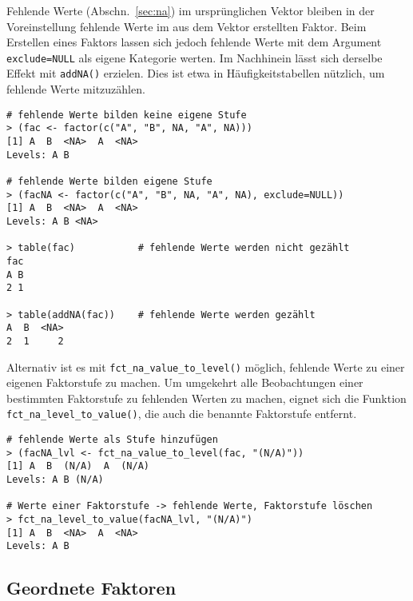 Fehlende Werte (Abschn.\ \ref{sec:na}) im ursprünglichen Vektor bleiben in der Voreinstellung fehlende Werte im aus dem Vektor erstellten Faktor. Beim Erstellen eines Faktors lassen sich jedoch fehlende Werte mit dem Argument \lstinline!exclude=NULL! als eigene Kategorie werten. Im Nachhinein lässt sich derselbe Effekt mit \lstinline!addNA()! erzielen. Dies ist etwa in Häufigkeitstabellen nützlich, um fehlende Werte mitzuzählen.
\begin{lstlisting}
# fehlende Werte bilden keine eigene Stufe
> (fac <- factor(c("A", "B", NA, "A", NA)))
[1] A  B  <NA>  A  <NA>
Levels: A B

# fehlende Werte bilden eigene Stufe
> (facNA <- factor(c("A", "B", NA, "A", NA), exclude=NULL))
[1] A  B  <NA>  A  <NA>
Levels: A B <NA>

> table(fac)           # fehlende Werte werden nicht gezählt
fac
A B 
2 1 

> table(addNA(fac))    # fehlende Werte werden gezählt
A  B  <NA> 
2  1     2 
\end{lstlisting}

Alternativ ist es mit \lstinline!fct_na_value_to_level()! möglich, fehlende Werte zu einer eigenen Faktorstufe zu machen. Um umgekehrt alle Beobachtungen einer bestimmten Faktorstufe zu fehlenden Werten zu machen, eignet sich die Funktion \lstinline!fct_na_level_to_value()!, die auch die benannte Faktorstufe entfernt.
\begin{lstlisting}
# fehlende Werte als Stufe hinzufügen
> (facNA_lvl <- fct_na_value_to_level(fac, "(N/A)"))
[1] A  B  (N/A)  A  (N/A)
Levels: A B (N/A)

# Werte einer Faktorstufe -> fehlende Werte, Faktorstufe löschen
> fct_na_level_to_value(facNA_lvl, "(N/A)")
[1] A  B  <NA>  A  <NA>
Levels: A B
\end{lstlisting}

\subsection{Geordnete Faktoren}
\label{sec:facOrder}

